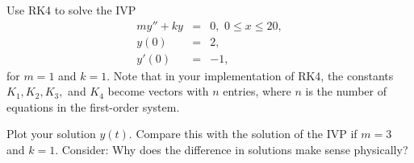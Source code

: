% 
% 	
% 
% 
% 


\begin{problem}
Use RK4 to solve the IVP
\begin{eqnarray*}
my'' + ky &=& 0,\,\, 0 \leq x \leq 20, \\
y(0) &=& 2, \\
y'(0) &=& -1,
\end{eqnarray*} 
for $m = 1$ and $k =1$. Note that in your implementation of RK4, the constants $K_1, K_2, K_3,$ and $K_4$ become vectors with $n$ entries, where $n$ is the number of equations in the first-order system. 


Plot your solution $y(t)$.  Compare this with the solution of the IVP if  $m = 3$ and $k =1$. Consider: Why does the difference in solutions make sense physically?
\end{problem}

